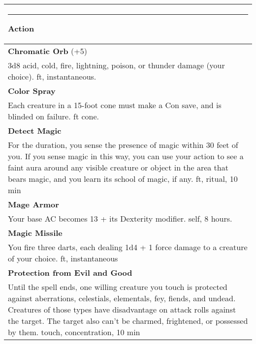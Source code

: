 \documentclass[twocolumn]{article}
\begin{document}
\\
\noindent\begin{tabular}{|m{3.1in}|}
\hline
\rule{1.25in}{0pt}Action\\
\hline
\textbf{Chromatic Orb} (+5) \\
3d8 acid, cold, fire, lightning, poison, or thunder damage (your choice).  {\sc 90 ft, instantaneous}.\\
\textbf{Color Spray}\\
Each creature in a 15-foot cone must make a Con save, and is blinded on failure.  {\sc 15 ft cone}.\\
\textbf{Detect Magic}\\
For the duration, you sense the presence of magic within 30 feet of you. If you sense magic in this way, you can use your action to see a faint aura around any visible creature or object in the area that bears magic, and you learn its school of magic, if any.  {\sc 30 ft, ritual, 10 min}\\
\textbf{Mage Armor}\\
Your base AC becomes 13 + its Dexterity modifier. {\sc self, 8 hours.}\\
\textbf{Magic Missile}\\
You fire three darts, each dealing 1d4 + 1 force damage to a creature of your choice. {\sc 120 ft, instantaneous} \\
\textbf{Protection from Evil and Good}\\
Until the spell ends, one willing creature you touch is protected against aberrations, celestials, elementals, fey, fiends, and undead.
Creatures of those types have disadvantage on attack rolls against the target. The target also can't be charmed, frightened, or possessed by them.
{\sc touch, concentration, 10 min} \\
\hline
\end{tabular}
\vspace{8pt}
\end{document}
